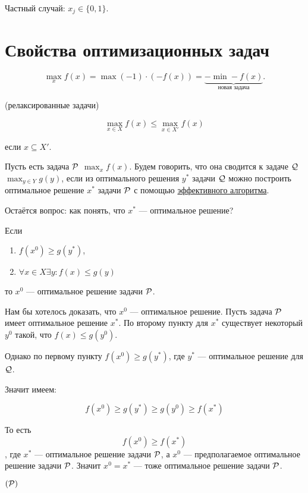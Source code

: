 Частный случай: $x_j \in \{0, 1\}$.

\section{Свойства оптимизационных задач}

\fact

\[\max_x f(x) = \max (-1) \cdot (-f(x)) = \underbrace{-\min -f(x)}_{\text{новая задача}}.\]

\fact {} (релаксированные задачи)

\[\max_{x \in X} f(x) \le \max_{x \in X'} f(x)\]

если $x \subseteq X'$.

\fact {}

Пусть есть задача $\P$ $\max_x f(x)$. Будем говорить, что она сводится к задаче $\Q$ $\max_{y \in Y} g(y)$, если из оптимального решения $y^*$ задачи $\Q$ можно построить оптимальное решение $x^*$ задачи $\P$ с помощью \underline{эффективного алгоритма}. 

Остаётся вопрос: как понять, что $x^*$ --- оптимальное решение?

\fact Если

\begin{enumerate}
	\item $f(x^0) \ge g(y^*)$,
	
	\item $\forall x \in X \exists y : f(x) \le g(y)$
\end{enumerate}

то $x^0$ --- оптимальное решение задачи $\P$.

\proof

Нам бы хотелось доказать, что $x^0$ --- оптимальное решение. Пусть задача $\P$ имеет оптимальное решение $x^*$. По второму пункту для $x^*$ существует некоторый $y^0$ такой, что $f(x) \le g(y^0)$.

Однако по первому пункту $f(x^0) \ge g(y^*)$, где $y^*$ --- оптимальное решение для $\Q$.

Значит имеем:

\[f(x^0) \ge g(y^*) \ge g(y^0) \ge f(x^*)\]

То есть \[f(x^0) \ge f(x^*)\], где $x^*$ --- оптимальное решение задачи $\P$, а $x^0$ --- предполагаемое оптимальное решение задачи $\P$. Значит $x^0 = x^*$ --- тоже оптимальное решение задачи $\P$.

\example

$(\P)$

